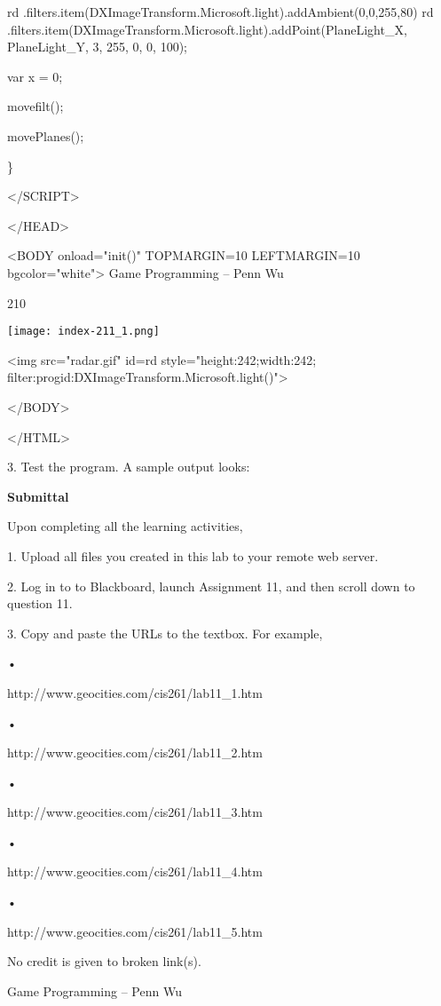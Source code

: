\documentclass[
]{article}
\begin{document}
rd
.filters.item(\textquotesingle DXImageTransform.Microsoft.light\textquotesingle).addAmbient(0,0,255,80)
rd
.filters.item(\textquotesingle DXImageTransform.Microsoft.light\textquotesingle).addPoint(PlaneLight\_X,
PlaneLight\_Y, 3, 255, 0, 0, 100);

var x = 0;

movefilt();

movePlanes();

\}

\textless/SCRIPT\textgreater{}

\textless/HEAD\textgreater{}

\textless BODY onload="init()" TOPMARGIN=10 LEFTMARGIN=10
bgcolor="white"\textgreater{} Game Programming -- Penn Wu

210

\protect\hypertarget{index_split_011.htmlux5cux23p211}{}{}\texttt{[image: index-211\_1.png]}

\textless img src="radar.gif" id=rd style="height:242;width:242;
filter:progid:DXImageTransform.Microsoft.light()"\textgreater{}

\textless/BODY\textgreater{}

\textless/HTML\textgreater{}

3. Test the program. A sample output looks:

\textbf{Submittal}

Upon completing all the learning activities,

1. Upload all files you created in this lab to your remote web server.

2. Log in to to Blackboard, launch Assignment 11, and then scroll down
to question 11.

3. Copy and paste the URLs to the textbox. For example,

•

http://www.geocities.com/cis261/lab11\_1.htm

•

http://www.geocities.com/cis261/lab11\_2.htm

•

http://www.geocities.com/cis261/lab11\_3.htm

•

http://www.geocities.com/cis261/lab11\_4.htm

•

http://www.geocities.com/cis261/lab11\_5.htm

No credit is given to broken link(s).

Game Programming -- Penn Wu
\end{document}
